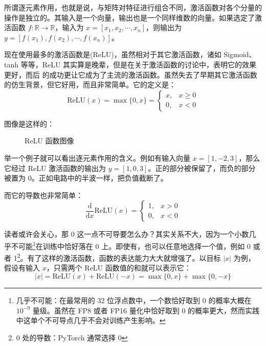 所谓逐元素作用，也就是说，与矩阵对特征进行组合不同，激活函数对各个分量的操作是独立的。其输入是一个向量，输出也是一个同样维数的向量。如果选定了激活函数 $f:\mathbb{R}\to\mathbb{R}$，输入为 $x = [x_1, x_2, \cdots, x_n]$，则输出为 $y = [f(x_1), f(x_2), \cdots, f(x_n)]$。

现在使用最多的激活函数是(ReLU)，虽然相对于其它激活函数，诸如 Sigmoid、tanh 等等，ReLU 其实算是晚辈，但是在关于激活函数的讨论中，表明它的效果更好，而后 的成功更让它成为了主流的激活函数。虽然失去了早期其它激活函数的仿生背景，但它好用，而且非常简单。它的定义是：
\[
    \text{ReLU}(x) = \max\{0, x\} = \begin{cases}
        x, & x \geq 0 \\
        0, & x < 0 
    \end{cases}
\]

图像是这样的：
\begin{figure}[H]
\centering
{}
\caption{ReLU 函数图像}
\end{figure}

举一个例子就可以看出逐元素作用的含义。例如有输入向量 $x = [1, -2, 3]$，那么它经过 ReLU 激活函数的输出为 $y = [1, 0, 3]$。正的部分被保留了，而负的部分被置为 0。正如电路中的半波一样，把负值截断了。

而它的导数也非常简单：
\[
    \frac{\mathrm{d}}{\mathrm{d} x}\text{ReLU}(x) = \begin{cases}
        1, & x > 0 \\
        0, & x < 0 
    \end{cases}
\]

读者或许会关心，那 0 这一点不可导要怎么办？其实关系不大，因为一个小数几乎不可能\footnote{几乎不可能：在最常用的 32 位浮点数中，一个数恰好取到 0 的概率大概在 $10^{-9}$ 量级。虽然在 FP8 或者 FP16 量化中恰好取到 0 的概率更大，然而实践中这单个不可导点几乎不会对训练产生影响。}在训练中恰好落在 0 上。即使有，也可以任意地选择一个值，例如 0 或者 1\footnote{0 处的导数：PyTorch 通常选择 0}。有了这样的激活函数，函数的表达能力大大就增强了。以目标 $|x|$ 为例，假设有输入 $x$，只需两个 ReLU 函数值的和就可以表示它：
\[
    |x| = \text{ReLU}(x) + \text{ReLU}(-x) = \max\{0, x\} + \max\{0, -x\}
\]


